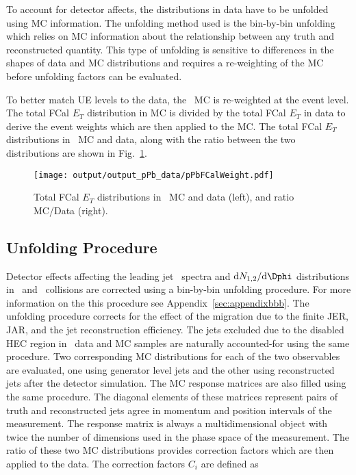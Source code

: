 To account for detector affects, the distributions in data have to be unfolded using MC information. The unfolding method used is the bin-by-bin unfolding which relies on MC information about the relationship between any truth and reconstructed quantity. This type of unfolding is sensitive to differences in the shapes of data and MC distributions and requires a re-weighting of the MC before unfolding factors can be evaluated. 

To better match UE levels to the data, the \pPb\ MC is re-weighted at the event level. The total FCal $E_{T}$ distribution in MC is divided by the total FCal $E_{T}$ in data to derive the event weights which are then applied to the MC. The total FCal $E_{T}$ distributions in \pPb\ MC and data, along with the ratio between the two distributions are shown in Fig.~\ref{fig:fcalet}. 

\begin{figure}
	\centering
	\texttt{[image: output/output\_pPb\_data/pPbFCalWeight.pdf]} 
	\caption{ Total FCal $E_{T}$ distributions in \pPb\ MC and data (left), and ratio MC/Data (right). }	
	\label{fig:fcalet}
\end{figure}

\subsection{Unfolding Procedure}
\label{sec:unfolding}

Detector effects affecting the leading jet \pT\ spectra and $\mathrm{d}N_{1,2}/\mathrm{d}\Dphi$ distributions in \pp\ and \pPb\ collisions are corrected using a bin-by-bin unfolding procedure. For more information on the this procedure see Appendix~\ref{sec:appendixbbb}. The unfolding procedure corrects for the effect of the migration due to the finite JER, JAR, and the jet reconstruction efficiency. The jets excluded due to the disabled HEC region in \pPb\ data and MC samples are naturally accounted-for using the same procedure. Two corresponding MC distributions for each of the two observables are evaluated, one using generator level jets and the other using reconstructed jets after the detector simulation. The MC response matrices are also filled using the same procedure. The diagonal elements of these matrices represent pairs of truth and reconstructed jets agree in momentum and position intervals of the measurement. The response matrix is always a multidimensional object with twice the number of dimensions used in the phase space of the measurement. The ratio of these two MC distributions provides correction factors which are then applied to the data. The correction factors $C_{i}$ are defined as  

